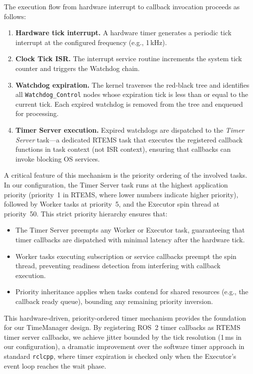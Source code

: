 The execution flow from hardware interrupt to callback invocation proceeds as follows:
\begin{enumerate}
    \item \textbf{Hardware tick interrupt.} A hardware timer generates a periodic tick interrupt at the configured frequency (e.g., 1\,kHz).
    \item \textbf{Clock Tick ISR.} The interrupt service routine increments the system tick counter and triggers the Watchdog chain.
    \item \textbf{Watchdog expiration.} The kernel traverses the red-black tree and identifies all \texttt{Watchdog\_Control} nodes whose expiration tick is less than or equal to the current tick. Each expired watchdog is removed from the tree and enqueued for processing.
    \item \textbf{Timer Server execution.} Expired watchdogs are dispatched to the \emph{Timer Server} task---a dedicated RTEMS task that executes the registered callback functions in task context (not ISR context), ensuring that callbacks can invoke blocking OS services.
\end{enumerate}

A critical feature of this mechanism is the priority ordering of the involved tasks.
In our configuration, the Timer Server task runs at the highest application priority (priority~1 in RTEMS, where lower numbers indicate higher priority), followed by Worker tasks at priority~5, and the Executor spin thread at priority~50.
This strict priority hierarchy ensures that:
\begin{itemize}
    \item The Timer Server preempts any Worker or Executor task, guaranteeing that timer callbacks are dispatched with minimal latency after the hardware tick.
    \item Worker tasks executing subscription or service callbacks preempt the spin thread, preventing readiness detection from interfering with callback execution.
    \item Priority inheritance applies when tasks contend for shared resources (e.g., the callback ready queue), bounding any remaining priority inversion.
\end{itemize}

This hardware-driven, priority-ordered timer mechanism provides the foundation for our TimeManager design.
By registering ROS~2 timer callbacks as RTEMS timer server callbacks, we achieve jitter bounded by the tick resolution (1\,ms in our configuration), a dramatic improvement over the software timer approach in standard \texttt{rclcpp}, where timer expiration is checked only when the Executor's event loop reaches the wait phase.